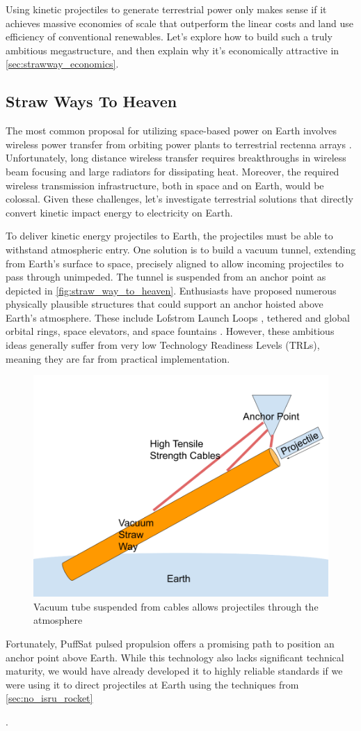 \documentclass{article}
\begin{document}
{Using kinetic projectiles to generate terrestrial power only makes sense if it achieves massive economies of scale that outperform the linear costs and land use efficiency of conventional renewables.  Let's explore how to build such a truly ambitious megastructure, and then explain why it's economically attractive in \autoref{sec:strawway_economics}.     

\subsection{Straw Ways To Heaven}\label{sec:straw_way_to_heaven}
The most common proposal for utilizing space-based power on Earth involves wireless power transfer from orbiting power plants to terrestrial rectenna arrays \cite{malaviya2022comprehensive}.  Unfortunately, long distance wireless transfer requires breakthroughs in wireless beam focusing \cite{space_beaming_power} and large radiators for dissipating heat. Moreover, the required wireless transmission infrastructure, both in space and on Earth, would be colossal.  Given these challenges, let's investigate terrestrial solutions that directly convert kinetic impact energy to electricity on Earth.

To deliver kinetic energy projectiles to Earth, the projectiles must be able to withstand atmospheric entry.  One solution is to build a vacuum tunnel, extending from Earth's surface to space, precisely aligned to allow incoming projectiles to pass through unimpeded.  The tunnel is suspended from an anchor point as depicted in \autoref{fig:straw_way_to_heaven}.   Enthusiasts have proposed numerous physically plausible structures that could support an anchor hoisted above Earth's atmosphere. These include Lofstrom Launch Loops \cite {lofstrom_loop}, tethered and global orbital rings, space elevators, and space fountains \cite{isaac_arthur_megastructure_complation}.  However, these ambitious ideas generally suffer from very low Technology Readiness Levels (TRLs), meaning they are far from practical implementation.

\begin{figure}[htpb]
    \centering
    \includegraphics[width=0.5\linewidth]{images/Straw Way To Heaven.png}
    \caption{Vacuum tube suspended from cables allows projectiles through the atmosphere}
    \label{fig:straw_way_to_heaven}
\end{figure}


Fortunately, PuffSat pulsed propulsion offers a promising path to position an anchor point above Earth. While this technology also lacks significant technical maturity, we would have already developed it to highly reliable standards if we were using it to direct projectiles at Earth using the techniques from \autoref{sec:no_isru_rocket}}.  
\end{document}
